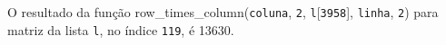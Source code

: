 \documentclass[12pt,varwidth=16cm,border=1pt]{standalone}
\begin{document}
O resultado da função row\_times\_column(\verb+coluna+, \verb+2+, \verb+l+[\verb+3958+], \verb+linha+, \verb+2+) para matriz da lista \verb+l+, no índice \verb+119+, é 13630.

\questiomtrue
\end{document}
